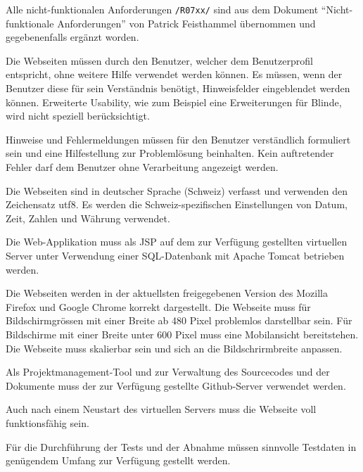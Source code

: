 Alle nicht-funktionalen Anforderungen \texttt{/R07xx/} sind aus dem Dokument "`Nicht-funktionale Anforderungen"' von Patrick Feisthammel \cite{patfeist15nifunanf} übernommen und gegebenenfalls ergänzt worden.

Die Webseiten müssen durch den Benutzer, welcher dem Benutzerprofil entspricht, ohne weitere Hilfe verwendet werden können. Es müssen, wenn der Benutzer diese für sein Verständnis benötigt, Hinweisfelder eingeblendet werden können.
Erweiterte Usability, wie zum Beispiel eine Erweiterungen für Blinde, wird nicht speziell berücksichtigt.

Hinweise und Fehlermeldungen müssen für den Benutzer verständlich formuliert sein und eine Hilfestellung zur Problemlösung beinhalten. Kein auftretender Fehler darf dem Benutzer ohne Verarbeitung angezeigt werden.

Die Webseiten sind in deutscher Sprache (Schweiz) verfasst und verwenden den Zeichensatz \gls{utf8}. Es werden die Schweiz-spezifischen Einstellungen von Datum, Zeit, Zahlen und Währung verwendet.

Die Web-Applikation muss als \gls{JSP} auf dem zur Verfügung gestellten virtuellen Server unter Verwendung einer SQL-Datenbank mit Apache Tomcat betrieben werden.

Die Webseiten werden in der aktuellsten freigegebenen Version des Mozilla Firefox und Google Chrome korrekt dargestellt. Die Webseite muss für Bildschirmgrössen mit einer Breite ab 480 Pixel problemlos darstellbar sein. Für Bildschirme mit einer Breite unter 600 Pixel muss eine Mobilansicht bereitstehen. Die Webseite muss skalierbar sein und sich an die Bildschrirmbreite anpassen.

Als Projektmanagement-Tool und zur Verwaltung des Sourcecodes und der Dokumente muss der zur Verfügung gestellte Github-Server verwendet werden.

Auch nach einem Neustart des virtuellen Servers muss die Webseite voll funktionsfähig sein.

Für die Durchführung der Tests und der Abnahme müssen sinnvolle Testdaten in genügendem Umfang zur Verfügung gestellt werden.

